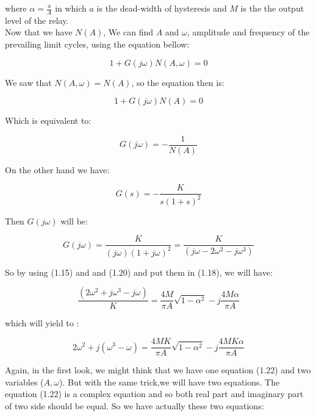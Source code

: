 \documentclass[11pt]{scrartcl} %
\begin{document}
\begin{itemize}
where $\alpha = \frac{a}{A}$ in which $a$ is the dead-width of hysteresis and $M$ is the the output level of the relay.\\

Now that we have $N(A)$, We can find $A$ and $\omega$, amplitude and frequency of the prevailing limit
cycles, using the equation bellow:

\begin{equation}
    1 + G(j\omega)N(A,\omega) = 0
\end{equation}

We saw that $N(A,\omega) = N(A)$, so the equation then is:

\begin{equation}
    1 + G(j\omega)N(A) = 0
\end{equation}

Which is equivalent to:

\begin{equation}
    G(j\omega) = - \frac{1}{N(A)}
\end{equation}

On the other hand we have:

\begin{equation}
    G(s) = - \frac{K}{s(1+s)^2}
\end{equation}

Then $G(j\omega)$ will be:

\begin{equation}
    G(j\omega) = \frac{K}{(j\omega)(1+j\omega)^2} = \frac{K}{(j\omega - 2\omega ^2 - j\omega ^3)}
\end{equation}

So by using (1.15) and and (1.20) and put them in (1.18), we will have:

\begin{equation}
    \frac{(2\omega ^2 + j\omega ^3 - j\omega)}{K} = \frac{4M}{\pi A} \sqrt{1-\alpha ^2} - j\frac{4M\alpha}{\pi A}
\end{equation}

which will yield to :

\begin{equation}
    2\omega ^2 + j(\omega ^3-\omega) = \frac{4MK}{\pi A} \sqrt{1-\alpha ^2} - j\frac{4MK\alpha}{\pi A}
\end{equation}

Again, in the first look, we might think that we have one equation (1.22) and two variables ($A, \omega$). But with the same trick,we will have two equations. The equation (1.22) is a complex equation and so both real part and imaginary part of two side should be equal. So we have actually these two equations:


\end{itemize}
\end{document}
